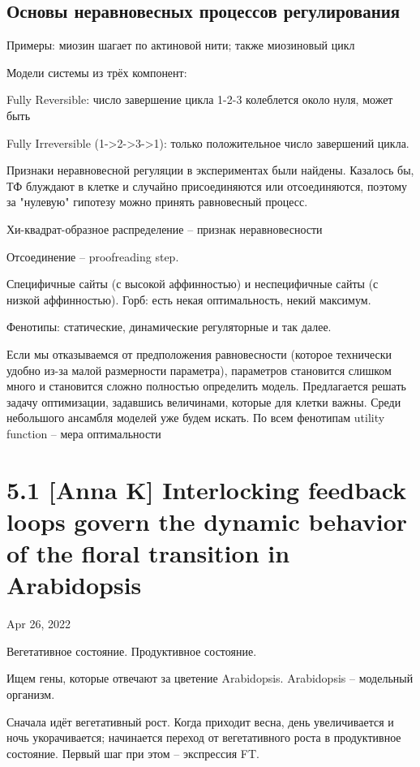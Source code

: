 \documentclass[a4paper,12pt]{article}
\begin{document}
\subsection{Основы неравновесных процессов регулирования}

Примеры: миозин шагает по актиновой нити; также миозиновый цикл

Модели системы из трёх компонент:

Fully Reversible: число завершение цикла 1-2-3 колеблется около нуля, может быть

Fully Irreversible (1->2->3->1): только положительное число завершений цикла.

Признаки неравновесной регуляции в экспериментах были найдены.
Казалось бы, ТФ блуждают в клетке и случайно присоединяются или отсоединяются, поэтому за "нулевую" гипотезу можно принять равновесный процесс.

Хи-квадрат-образное распределение -- признак неравновесности

Отсоединение -- proofreading step.

Специфичные сайты (с высокой аффинностью) и неспецифичные сайты (с низкой аффинностью).
Горб: есть некая оптимальность, некий максимум.

Фенотипы: статические, динамические регуляторные и так далее.

Если мы отказываемся от предположения равновесности (которое технически удобно из-за малой размерности параметра), параметров становится слишком много и становится сложно полностью определить модель.
Предлагается решать задачу оптимизации, задавшись величинами, которые для клетки важны.
Среди небольшого ансамбля моделей уже будем искать.
По всем фенотипам utility function -- мера оптимальности

\section{5.1 [Anna K] Interlocking feedback loops govern the dynamic behavior of the floral transition in Arabidopsis}

Apr 26, 2022

Вегетативное состояние.
Продуктивное состояние.

Ищем гены, которые отвечают за цветение Arabidopsis.
Arabidopsis -- модельный организм.

Сначала идёт вегетативный рост.
Когда приходит весна, день увеличивается и ночь укорачивается; начинается переход от вегетативного роста в продуктивное состояние.
Первый шаг при этом -- экспрессия FT.
\end{document}

